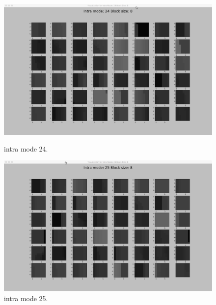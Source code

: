 \begin{figure}[H]
    \begin{minipage}{0.49\textwidth}
        \includegraphics[width=\linewidth]{Figures/visu-size8x8/8-24}
        \caption[Intra mode 24]{intra mode 24.}
        \label{fig:size8_mode24}
    \end{minipage}
    \hspace{\fill} %
    \begin{minipage}{0.49\textwidth}
        \includegraphics[width=\linewidth]{Figures/visu-size8x8/8-25}
        \caption[Intra mode 25]{intra mode 25.}
        \label{fig:size8_mode25}
    \end{minipage}
    
    \vspace*{1cm} %


\end{figure}
